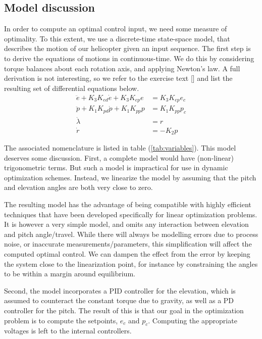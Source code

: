 \subsection{Model discussion}
In order to compute an optimal control input, we need some measure of optimality.
To this extent, we use a discrete-time state-space model, that describes the motion
of our helicopter given an input sequence. The first step is to derive the equations
of motions in continuous-time. We do this by considering torque balances about each
rotation axis, and applying Newton's law. A full derivation is not interesting, so
we refer to the exercise text [\cite{LabExercise}] and list the resulting set of
differential equations below.
\begin{subequations}
\label{eq:model_al}
\begin{align}
    \ddot{e} + K_{3} K_{ed} \dot{e} + K_{3} K_{ep} e &= K_{3} K_{ep} e_{c} \label{eq:model_se_al_elev} \\
    \ddot{p} + K_{1} K_{pd} \dot{p} + K_{1} K_{pp} p &= K_{1} K_{pp} p_{c} \label{eq:model_se_al_pitch} \\
    \dot{\lambda} &= r \label{eq:model_se_al_lambda} \\
    \dot{r} &= -K_{2} p \label{eq:model_se_al_r}
\end{align}
\end{subequations}

The associated nomenclature is listed in table (\ref{tab:variables}). This model deserves some discussion. First, a complete model would have (non-linear) trigonometric terms. But such a model is impractical for use in dynamic optimization schemes. Instead, we linearize the model by assuming that the pitch and elevation angles are both very close to zero.

The resulting model has the advantage of being compatible with highly efficient techniques that have been developed specifically for linear optimization problems. It is however a very simple model, and omits any interaction between elevation and pitch angle/travel. While there will always be modelling errors due to process noise, or inaccurate measurements/parameters, this simplification will affect the computed optimal control. We can dampen the effect from the error by keeping the system close to the linearization point, for instance by constraining the angles to be within a margin around equilibrium.

Second, the model incorporates a PID controller for the elevation, which is assumed to counteract the constant torque due to gravity, as well as a PD controller for the pitch. The result of this is that our goal in the optimization problem is to compute the setpoints, $e_c$ and $p_c$. Computing the appropriate voltages is left to the internal controllers.

